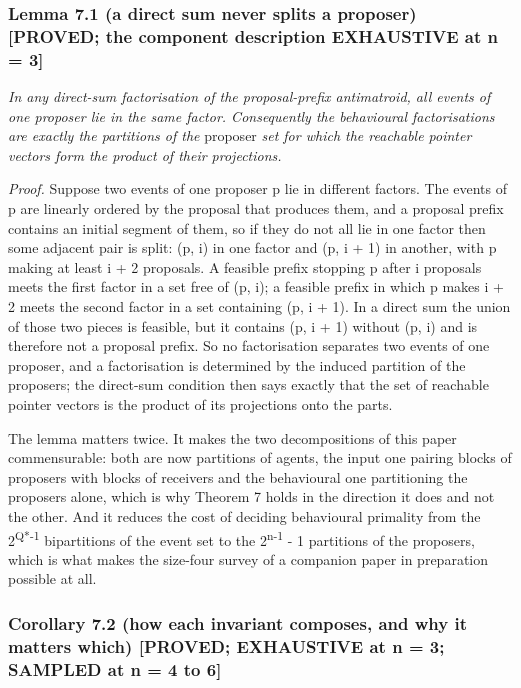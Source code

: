 \documentclass[
  11pt,
]{article}
\begin{document}
\hypertarget{lemma-7.1-a-direct-sum-never-splits-a-proposer-proved-the-component-description-exhaustive-at-n-3}{%
\subsubsection{Lemma 7.1 (a direct sum never splits a proposer)
{[}PROVED; the component description EXHAUSTIVE at n =
3{]}}\label{lemma-7.1-a-direct-sum-never-splits-a-proposer-proved-the-component-description-exhaustive-at-n-3}}

\emph{In any direct-sum factorisation of the proposal-prefix
antimatroid, all events of one proposer lie in the same factor.
Consequently the behavioural factorisations are exactly the partitions
of the} proposer \emph{set for which the reachable pointer vectors form
the product of their projections.}

\emph{Proof.} Suppose two events of one proposer p lie in different
factors. The events of p are linearly ordered by the proposal that
produces them, and a proposal prefix contains an initial segment of
them, so if they do not all lie in one factor then some adjacent pair is
split: (p, i) in one factor and (p, i + 1) in another, with p making at
least i + 2 proposals. A feasible prefix stopping p after i proposals
meets the first factor in a set free of (p, i); a feasible prefix in
which p makes i + 2 meets the second factor in a set containing (p, i +
1). In a direct sum the union of those two pieces is feasible, but it
contains (p, i + 1) without (p, i) and is therefore not a proposal
prefix. So no factorisation separates two events of one proposer, and a
factorisation is determined by the induced partition of the proposers;
the direct-sum condition then says exactly that the set of reachable
pointer vectors is the product of its projections onto the parts.

The lemma matters twice. It makes the two decompositions of this paper
commensurable: both are now partitions of agents, the input one pairing
blocks of proposers with blocks of receivers and the behavioural one
partitioning the proposers alone, which is why Theorem 7 holds in the
direction it does and not the other. And it reduces the cost of deciding
behavioural primality from the 2\textsuperscript{Q*-1} bipartitions of
the event set to the 2\textsuperscript{n-1} - 1 partitions of the
proposers, which is what makes the size-four survey of a companion paper
in preparation possible at all.

\hypertarget{corollary-7.2-how-each-invariant-composes-and-why-it-matters-which-proved-exhaustive-at-n-3-sampled-at-n-4-to-6}{%
\subsubsection{Corollary 7.2 (how each invariant composes, and why it
matters which) {[}PROVED; EXHAUSTIVE at n = 3; SAMPLED at n = 4 to
6{]}}\label{corollary-7.2-how-each-invariant-composes-and-why-it-matters-which-proved-exhaustive-at-n-3-sampled-at-n-4-to-6}}
\end{document}
